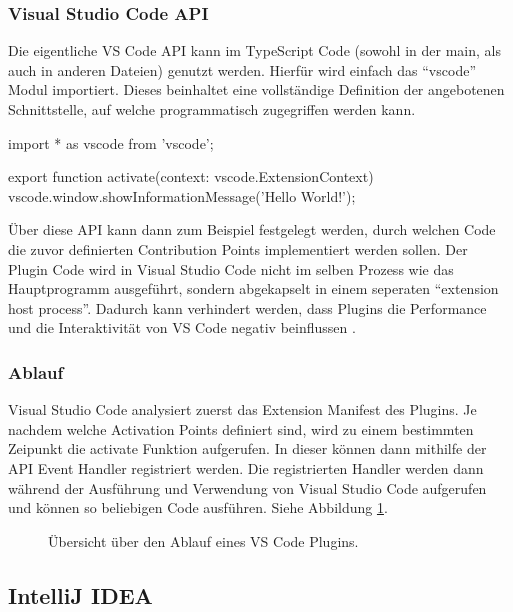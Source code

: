 \subsubsection{Visual Studio Code API} 
  Die eigentliche VS Code API kann im TypeScript Code (sowohl in der main, 
  als auch in anderen Dateien) genutzt werden. Hierfür wird einfach das \enquote{vscode}
  Modul importiert. Dieses beinhaltet eine vollständige Definition der angebotenen
  Schnittstelle, auf welche programmatisch zugegriffen werden kann.
  \begin{JsCode}
    import * as vscode from 'vscode';

    export function activate(context: vscode.ExtensionContext) {
      vscode.window.showInformationMessage('Hello World!');
    }
  \end{JsCode}
  Über diese API kann dann zum Beispiel festgelegt werden, durch welchen Code
  die zuvor definierten Contribution Points implementiert werden sollen.
  Der Plugin Code wird in Visual Studio Code nicht im selben Prozess wie das
  Hauptprogramm ausgeführt, sondern abgekapselt in einem seperaten 
  \enquote{extension host process}. Dadurch kann verhindert werden, dass
  Plugins die Performance und die Interaktivität von VS Code negativ beinflussen 
  \cite{VSCodeArchitecture,VSCodeApproachToExtensibility}.
\subsubsection{Ablauf}
  Visual Studio Code analysiert zuerst das Extension Manifest des Plugins.
  Je nachdem welche Activation Points definiert sind, wird zu einem
  bestimmten Zeipunkt die activate Funktion aufgerufen. In dieser 
  können dann mithilfe der API Event Handler registriert werden. 
  Die registrierten Handler werden dann während der Ausführung und Verwendung
  von Visual Studio Code aufgerufen und können so beliebigen Code ausführen.
  Siehe Abbildung \ref{fig:diagram_VSCodeExtensionArchitecture}.
  \begin{figure}
    \centering
    \caption{Übersicht über den Ablauf eines VS Code Plugins.}
    \label{fig:diagram_VSCodeExtensionArchitecture}
  \end{figure}   

\subsection{IntelliJ IDEA}

